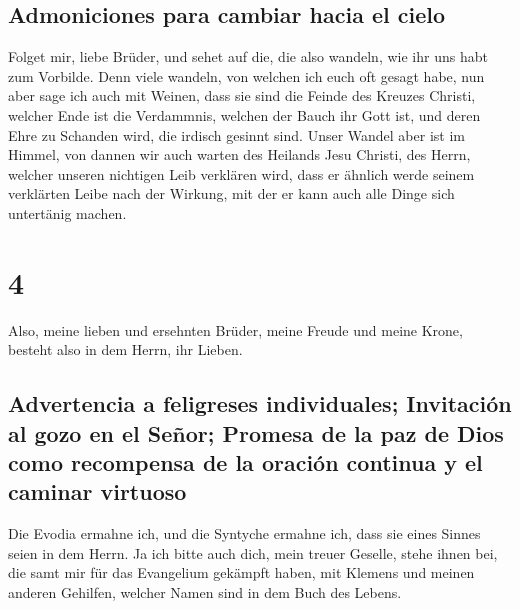 \hypertarget{admoniciones-para-cambiar-hacia-el-cielo}{%
\subsection{Admoniciones para cambiar hacia el
cielo}\label{admoniciones-para-cambiar-hacia-el-cielo}}

 Folget mir, liebe Brüder, und sehet auf die, die also
wandeln, wie ihr uns habt zum Vorbilde.  Denn viele
wandeln, von welchen ich euch oft gesagt habe, nun aber sage ich auch
mit Weinen, dass sie sind die Feinde des Kreuzes Christi,
 welcher Ende ist die Verdammnis, welchen der Bauch ihr
Gott ist, und deren Ehre zu Schanden wird, die irdisch gesinnt sind.
 Unser Wandel aber ist im Himmel, von dannen wir auch
warten des Heilands Jesu Christi, des Herrn,  welcher
unseren nichtigen Leib verklären wird, dass er ähnlich werde seinem
verklärten Leibe nach der Wirkung, mit der er kann auch alle Dinge sich
untertänig machen.

\hypertarget{section-3}{%
\section{4}\label{section-3}}

 Also, meine lieben und ersehnten Brüder, meine Freude und
meine Krone, besteht also in dem Herrn, ihr Lieben.

\hypertarget{advertencia-a-feligreses-individuales-invitaciuxf3n-al-gozo-en-el-seuxf1or-promesa-de-la-paz-de-dios-como-recompensa-de-la-oraciuxf3n-continua-y-el-caminar-virtuoso}{%
\subsection{Advertencia a feligreses individuales; Invitación al gozo en
el Señor; Promesa de la paz de Dios como recompensa de la oración
continua y el caminar
virtuoso}\label{advertencia-a-feligreses-individuales-invitaciuxf3n-al-gozo-en-el-seuxf1or-promesa-de-la-paz-de-dios-como-recompensa-de-la-oraciuxf3n-continua-y-el-caminar-virtuoso}}

 Die Evodia ermahne ich, und die Syntyche ermahne ich,
dass sie eines Sinnes seien in dem Herrn.  Ja ich bitte
auch dich, mein treuer Geselle, stehe ihnen bei, die samt mir für das
Evangelium gekämpft haben, mit Klemens und meinen anderen Gehilfen,
welcher Namen sind in dem Buch des Lebens.

